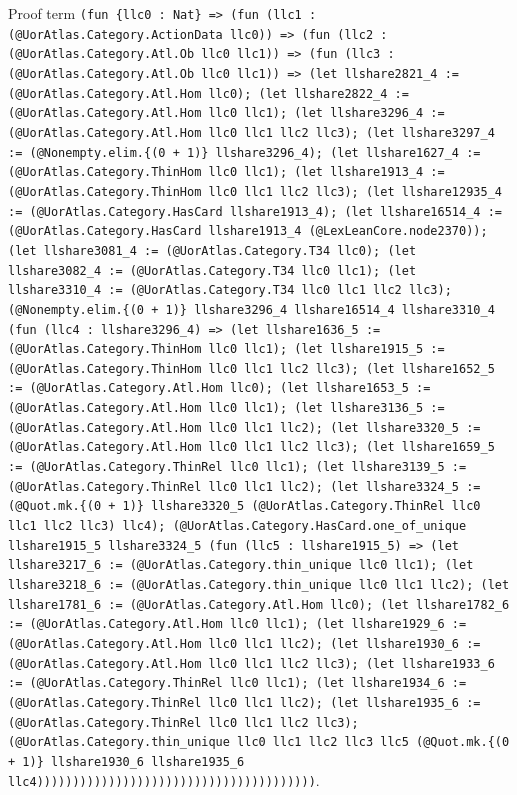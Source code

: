 \documentclass[11pt]{article}
\begin{document}
\noindent Proof term \texttt{(fun \{llc0 : Nat\} => (fun (llc1 : (@UorAtlas.Category.ActionData llc0)) => (fun (llc2 : (@UorAtlas.Category.Atl.Ob llc0 llc1)) => (fun (llc3 : (@UorAtlas.Category.Atl.Ob llc0 llc1)) => (let llshare2821\_4 := (@UorAtlas.Category.Atl.Hom llc0); (let llshare2822\_4 := (@UorAtlas.Category.Atl.Hom llc0 llc1); (let llshare3296\_4 := (@UorAtlas.Category.Atl.Hom llc0 llc1 llc2 llc3); (let llshare3297\_4 := (@Nonempty.elim.\{(0 + 1)\} llshare3296\_4); (let llshare1627\_4 := (@UorAtlas.Category.ThinHom llc0 llc1); (let llshare1913\_4 := (@UorAtlas.Category.ThinHom llc0 llc1 llc2 llc3); (let llshare12935\_4 := (@UorAtlas.Category.HasCard llshare1913\_4); (let llshare16514\_4 := (@UorAtlas.Category.HasCard llshare1913\_4 (@LexLeanCore.node2370)); (let llshare3081\_4 := (@UorAtlas.Category.T34 llc0); (let llshare3082\_4 := (@UorAtlas.Category.T34 llc0 llc1); (let llshare3310\_4 := (@UorAtlas.Category.T34 llc0 llc1 llc2 llc3); (@Nonempty.elim.\{(0 + 1)\} llshare3296\_4 llshare16514\_4 llshare3310\_4 (fun (llc4 : llshare3296\_4) => (let llshare1636\_5 := (@UorAtlas.Category.ThinHom llc0 llc1); (let llshare1915\_5 := (@UorAtlas.Category.ThinHom llc0 llc1 llc2 llc3); (let llshare1652\_5 := (@UorAtlas.Category.Atl.Hom llc0); (let llshare1653\_5 := (@UorAtlas.Category.Atl.Hom llc0 llc1); (let llshare3136\_5 := (@UorAtlas.Category.Atl.Hom llc0 llc1 llc2); (let llshare3320\_5 := (@UorAtlas.Category.Atl.Hom llc0 llc1 llc2 llc3); (let llshare1659\_5 := (@UorAtlas.Category.ThinRel llc0 llc1); (let llshare3139\_5 := (@UorAtlas.Category.ThinRel llc0 llc1 llc2); (let llshare3324\_5 := (@Quot.mk.\{(0 + 1)\} llshare3320\_5 (@UorAtlas.Category.ThinRel llc0 llc1 llc2 llc3) llc4); (@UorAtlas.Category.HasCard.one\_of\_unique llshare1915\_5 llshare3324\_5 (fun (llc5 : llshare1915\_5) => (let llshare3217\_6 := (@UorAtlas.Category.thin\_unique llc0 llc1); (let llshare3218\_6 := (@UorAtlas.Category.thin\_unique llc0 llc1 llc2); (let llshare1781\_6 := (@UorAtlas.Category.Atl.Hom llc0); (let llshare1782\_6 := (@UorAtlas.Category.Atl.Hom llc0 llc1); (let llshare1929\_6 := (@UorAtlas.Category.Atl.Hom llc0 llc1 llc2); (let llshare1930\_6 := (@UorAtlas.Category.Atl.Hom llc0 llc1 llc2 llc3); (let llshare1933\_6 := (@UorAtlas.Category.ThinRel llc0 llc1); (let llshare1934\_6 := (@UorAtlas.Category.ThinRel llc0 llc1 llc2); (let llshare1935\_6 := (@UorAtlas.Category.ThinRel llc0 llc1 llc2 llc3); (@UorAtlas.Category.thin\_unique llc0 llc1 llc2 llc3 llc5 (@Quot.mk.\{(0 + 1)\} llshare1930\_6 llshare1935\_6 llc4)))))))))))))))))))))))))))))))))))))))}.\par
\end{document}
